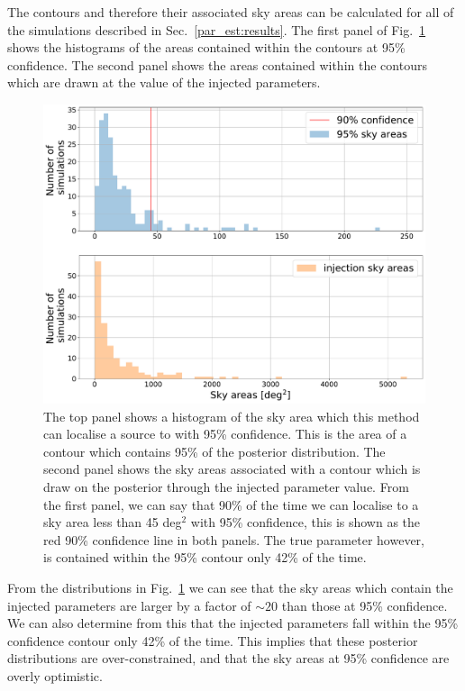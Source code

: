 The contours and therefore their associated sky areas can be calculated for all
of the simulations described in Sec.~\ref{par_est:results}. The first panel of Fig.~\ref{par_est:results:sky_area} shows the histograms of the areas contained within the contours at 95\% confidence. The second panel shows the areas contained within the contours which are drawn at the value of the injected parameters.
%
\begin{figure}[ht]
    \centering
    \includegraphics[width=\linewidth]{C5_parameter/sky_area_hist.pdf}
    \caption[histogram showing the area contained within 90\% confidence contours]{
    	The top panel shows a histogram of the sky area which this method can localise a source to with 95\% confidence. This is the area of a contour which contains 95\% of the posterior distribution.
    	The second panel shows the sky areas associated with a contour which is draw on the posterior through the injected parameter value. 
    	From the first panel, we can say that 90\% of the time we can localise to a sky area less than 45 deg$^2$ with 95\% confidence, this is shown as the red 90\% confidence line in both panels.
    	The true parameter however, is contained within the 95\% contour only 42\% of the time.}
\label{par_est:results:sky_area} 
\end{figure}
%
From the distributions in Fig.~\ref{par_est:results:sky_area} we can see that
the sky areas which contain the injected parameters are larger by a factor of
$\sim 20$ than those at 95\% confidence.  We can also determine from this that the injected
parameters fall within the 95\% confidence contour only 42\% of the time.  This
implies that these posterior distributions are over-constrained, and that the sky areas at 95\% confidence are overly optimistic.

